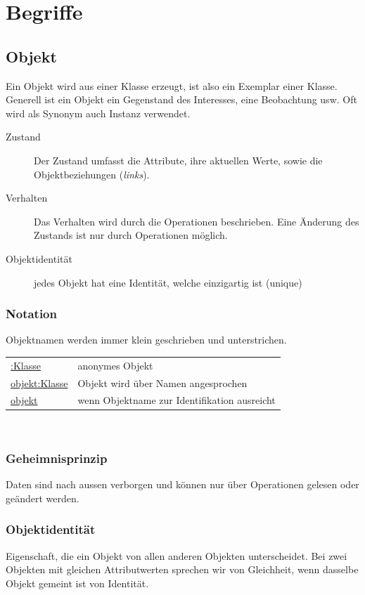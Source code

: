 \section{Begriffe}

\subsection{Objekt }
	Ein Objekt wird aus einer Klasse erzeugt, ist also ein Exemplar einer Klasse. Generell
	ist ein Objekt ein Gegenstand des Interesses, eine Beobachtung usw. Oft wird als
	Synonym auch Instanz verwendet.
	\begin{description}
		\item[Zustand] Der Zustand umfasst die Attribute, ihre aktuellen Werte, sowie
			die Objektbeziehungen (\textit{links}).
		\item[Verhalten] Das Verhalten wird durch die Operationen beschrieben. Eine
			Änderung des Zustands ist nur durch Operationen möglich.
		\item[Objektidentität] jedes Objekt hat eine Identität, welche einzigartig ist
			(unique)
	\end{description}
	\subsubsection{Notation}
		Objektnamen werden immer klein geschrieben und unterstrichen. \\
		\begin{tabular}{l l}
			\underline{:Klasse} & anonymes Objekt \\
			\underline{objekt:Klasse} & Objekt wird über Namen angesprochen \\
			\underline{objekt} & wenn Objektname zur Identifikation ausreicht \\
		\end{tabular}\\
	\begin{multicols}{2}	
	\subsubsection{Geheimnisprinzip}
	Daten sind nach aussen verborgen und können nur über Operationen gelesen oder geändert werden.\\
	\subsubsection{Objektidentität}
	Eigenschaft, die ein Objekt von allen anderen Objekten unterscheidet. Bei zwei Objekten
	mit gleichen Attributwerten sprechen wir von Gleichheit, wenn dasselbe Objekt gemeint
	ist von Identität.
	\end{multicols}
	
